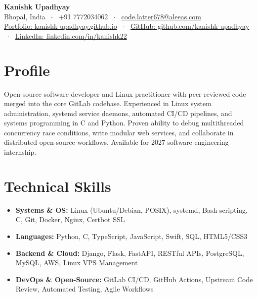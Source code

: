 \documentclass[10pt,a4paper]{article}
\begin{document}
\begin{center}
    {\huge \textbf{Kanishk Upadhyay}} \\ \vspace{2pt}
    Bhopal, India \ $\cdot$ \ +91 7772034062 \ $\cdot$ \ \href{mailto:code.latter678@aleeas.com}{code.latter678@aleeas.com} \\ \vspace{2pt}
    \href{https://kanishk-upadhyay.github.io/}{Portfolio: kanishk-upadhyay.github.io} \ $\cdot$ \ 
    \href{https://github.com/kanishk-upadhyay}{GitHub: github.com/kanishk-upadhyay} \ $\cdot$ \ 
    \href{https://linkedin.com/in/kanishk22}{LinkedIn: linkedin.com/in/kanishk22}
\end{center}

\vspace{-6pt}
\section{Profile}
Open-source software developer and Linux practitioner with peer-reviewed code merged into the core GitLab codebase. Experienced in Linux system administration, systemd service daemons, automated CI/CD pipelines, and systems programming in C and Python. Proven ability to debug multithreaded concurrency race conditions, write modular web services, and collaborate in distributed open-source workflows. Available for 2027 software engineering internship.

\section{Technical Skills}
\begin{itemize}
    \item \textbf{Systems \& OS:} Linux (Ubuntu/Debian, POSIX), systemd, Bash scripting, C, Git, Docker, Nginx, Certbot SSL
    \item \textbf{Languages:} Python, C, TypeScript, JavaScript, Swift, SQL, HTML5/CSS3
    \item \textbf{Backend \& Cloud:} Django, Flask, FastAPI, RESTful APIs, PostgreSQL, MySQL, AWS, Linux VPS Management
    \item \textbf{DevOps \& Open-Source:} GitLab CI/CD, GitHub Actions, Upstream Code Review, Automated Testing, Agile Workflows
\end{itemize}
\end{document}
